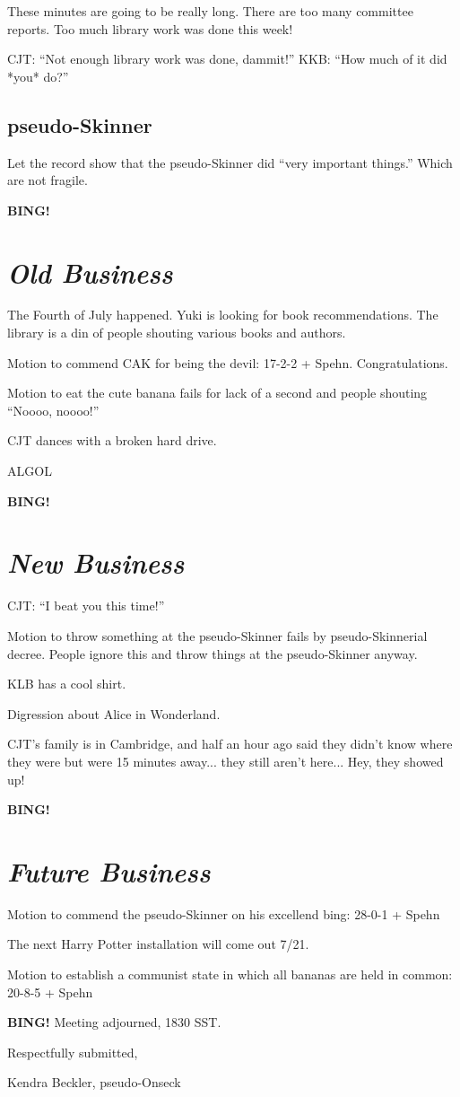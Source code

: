 \documentclass[10pt]{article}
\newcommand{\bing}{{\bf BING!} }
\newcommand{\goto}[1]{\bing \vskip 12pt \section*{{\em{#1}}}}
\begin{document}
These minutes are going to be really long.  There are too many committee reports.  Too much library work was done this week!

CJT: ``Not enough library work was done, dammit!''  KKB: ``How much of it did *you* do?''

\subsection*{pseudo-Skinner}

Let the record show that the pseudo-Skinner did ``very important things.''  Which are not fragile.

\goto{Old Business}

The Fourth of July happened.  Yuki is looking for book recommendations.  The library is a din of people shouting various books and authors.

Motion to commend CAK for being the devil: 17-2-2 + Spehn.  Congratulations.

Motion to eat the cute banana fails for lack of a second and people shouting ``Noooo, noooo!''

CJT dances with a broken hard drive.

ALGOL

\goto{New Business}

CJT: ``I beat you this time!''

Motion to throw something at the pseudo-Skinner fails by pseudo-Skinnerial decree.  People ignore this and throw things at the pseudo-Skinner anyway.

KLB has a cool shirt.

Digression about Alice in Wonderland.

CJT's family is in Cambridge, and half an hour ago said they didn't know where they were but were 15 minutes away... they still aren't here...  Hey, they showed up!

\goto{Future Business}

Motion to commend the pseudo-Skinner on his excellend bing: 28-0-1 + Spehn

The next Harry Potter installation will come out 7/21.

Motion to establish a communist state in which all bananas are held in common: 20-8-5 + Spehn

\bing
\noindent
Meeting adjourned, 1830 SST.

\vspace{18pt}

\centerline{Respectfully submitted,}
\centerline{Kendra Beckler, pseudo-Onseck}
\end{document}
